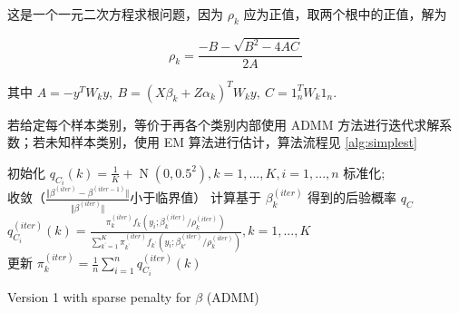 \documentclass[12pt, a4paper, oneside]{article}
\numberwithin{equation}{section}
\begin{document}
这是一个一元二次方程求根问题，因为 $\rho_k$ 应为正值，取两个根中的正值，解为

\begin{equation}
	\rho_k = \frac{-B-\sqrt{B^2 - 4AC}}{2A}
\end{equation}

其中 $A = -y^TW_k y,\ B = (X\beta_k+Z\alpha_k)^T W_k y,\ C = 1_n^T W_k 1_n.$

若给定每个样本类别，等价于再各个类别内部使用 ADMM 方法进行迭代求解系数；若未知样本类别，使用 EM 算法进行估计，算法流程见 \ref{alg:simplest}

\IncMargin{1em} %
\begin{algorithm}
	
	
	\BlankLine
	
	初始化 $q_{C_i}(k) = \frac{1}{K}+\operatorname{N}(0,0.5^2), k=1,...,K,i=1,...,n$ 标准化; \\
	\Repeat
	{收敛（$ \frac{\Vert\beta^{(iter)}-\beta^{(iter-1)}\Vert}{\Vert\beta^{(iter)}\Vert} $小于临界值）}
	{
		计算基于 $\beta_k^{(iter)}$ 得到的后验概率 $q_C$\\
		\qquad $q^{(iter)}_{C_i}(k) = \frac{{\pi_k^{(iter)} f_k(y_i;\beta_{k}^{(iter)}/\rho_k^{(iter)})}}{\sum_{{k^\prime}=1}^{K}\pi^{(iter)}_{k^\prime} f_{k^\prime}(y_i;\beta_{k\prime}^{(iter)}/\rho_k^{(iter)})}, k = 1,...,K$ \\
		更新 $\pi^{(iter)}_k = \frac{1}{n}\sum_{i=1}^{n}q^{(iter)}_{C_i}(k)$ \\
	}
	\caption{Version 1 with sparse penalty for $\beta$ (ADMM)}
	\label{alg:simplest}
\end{algorithm}
\DecMargin{1em}
\end{document}
